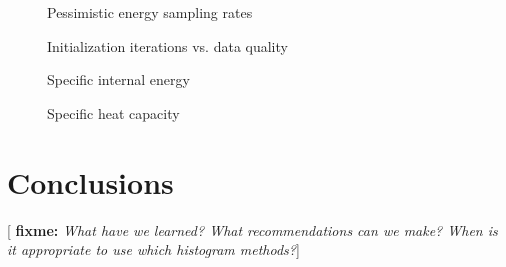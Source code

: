 \documentclass[11pt]{article}
\newcommand{\red}[1]{{\bf \color{red} #1}}
\newcommand{\fixme}[1]{[\red{fixme:} \emph{#1}]}
\begin{document}
\begin{figure}[H]
  \centering
  \caption[Pessimistic energy sampling rates]{Pessimistic energy
    sampling rates}
  \label{fig:pes_sample_rate}
\end{figure}

\begin{figure}[H]
  \centering
  \caption[Initialization iterations vs. data quality]{Initialization
    iterations vs. data quality}
  \label{fig:quality}
\end{figure}

\begin{figure}[H]
  \centering
  \caption[Specific internal energy]{Specific internal energy}
  \label{fig:internal_energy}
\end{figure}

\begin{figure}[H]
  \centering
  \caption[Specific heat capacity]{Specific heat capacity}
  \label{fig:heat_capacity}
\end{figure}


\section{Conclusions}
\label{sec:conclusions}

\fixme{What have we learned? What recommendations can we make? When is
  it appropriate to use which histogram methods?}


\nocite{*} 
\end{document}
